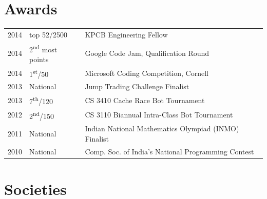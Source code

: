 \documentclass[a4paper]{deedy-resume} %
\begin{document}
\begin{minipage}[t]{0.66\textwidth}
\begin{tightitemize}
\item
\end{tightitemize}

\sectionspace %



\begin{tightitemize}
\item
\end{tightitemize}

\sectionspace %


\section{Awards} 

\begin{tabular}{rll}
2014	 & top 52/2500 & KPCB Engineering Fellow\\
2014	 & 2\textsuperscript{nd} most points & Google Code Jam, Qualification Round\\
2014	 & 1\textsuperscript{st}/50 & Microsoft Coding Competition, Cornell\\
2013	 & National & Jump Trading Challenge Finalist\\
2013 & 7\textsuperscript{th}/120 & CS 3410 Cache Race Bot Tournament \\
2012 & 2\textsuperscript{nd}/150 & CS 3110 Biannual Intra-Class Bot Tournament \\
2011 & National & Indian National Mathematics Olympiad (INMO) Finalist \\
2010 & National & Comp. Soc. of India's National Programming Contest\\
\end{tabular}

\sectionspace %


\section{Societies} 


\end{minipage}
\end{document}
